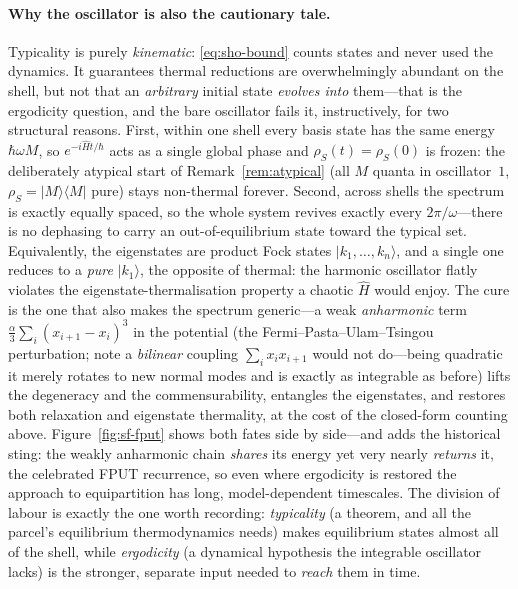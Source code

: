 \documentclass[11pt,a4paper]{article}
\theoremstyle{definition}
\begin{document}
\paragraph{Why the oscillator is also the cautionary tale.} Typicality is purely
\emph{kinematic}: \eqref{eq:sho-bound} counts states and never used the dynamics.
It guarantees thermal reductions are overwhelmingly abundant on the shell, but
not that an \emph{arbitrary} initial state \emph{evolves into} them---that is the
ergodicity question, and the bare oscillator fails it, instructively, for two
structural reasons. First, within one shell every basis state has the same
energy $\hbar\omega M$, so $e^{-i\hat Ht/\hbar}$ acts as a single global phase
and $\rho_S(t)=\rho_S(0)$ is frozen: the deliberately atypical start of
Remark~\ref{rem:atypical} (all $M$ quanta in oscillator~$1$,
$\rho_S=|M\rangle\langle M|$ pure) stays non-thermal forever. Second, across shells the spectrum is exactly equally spaced, so the
whole system revives exactly every $2\pi/\omega$---there is no dephasing to carry
an out-of-equilibrium state toward the typical set. Equivalently, the eigenstates
are product Fock states $|k_1,\dots,k_n\rangle$, and a single one reduces to a
\emph{pure} $|k_1\rangle$, the opposite of thermal: the harmonic oscillator flatly
violates the eigenstate-thermalisation property a chaotic $\hat H$ would enjoy.
The cure is the one that also makes the spectrum generic---a weak
\emph{anharmonic} term $\tfrac{\alpha}{3}\sum_i(x_{i+1}-x_i)^{3}$ in the
potential (the Fermi--Pasta--Ulam--Tsingou perturbation; note a \emph{bilinear}
coupling $\sum_i x_ix_{i+1}$ would not do---being quadratic it merely rotates to
new normal modes and is exactly as integrable as before) lifts the degeneracy
and the commensurability, entangles the
eigenstates, and restores both relaxation and eigenstate thermality, at the cost
of the closed-form counting above. Figure~\ref{fig:sf-fput} shows both fates
side by side---and adds the historical sting: the weakly anharmonic chain
\emph{shares} its energy yet very nearly \emph{returns} it, the celebrated FPUT
recurrence, so even where ergodicity is restored the approach to equipartition
has long, model-dependent timescales. The division of labour is exactly the one
worth recording: \emph{typicality} (a theorem, and all the parcel's equilibrium
thermodynamics needs) makes equilibrium states almost all of the shell, while
\emph{ergodicity} (a dynamical hypothesis the integrable oscillator lacks) is the
stronger, separate input needed to \emph{reach} them in time.
\end{document}
